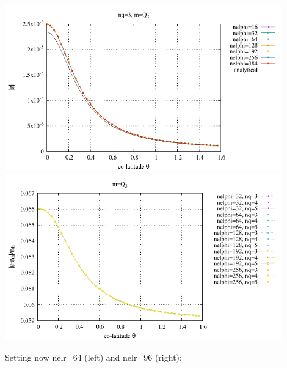 \begin{center}
\includegraphics[width=12cm]{python_codes/fieldstone_152/RESULTS/exp2/gravity/nelr32/gravity.pdf}
\includegraphics[width=12cm]{python_codes/fieldstone_152/RESULTS/exp2/gravity/nelr32/gravity_error.pdf}
\end{center}

Setting now {\python nelr=64} (left) and {\python nelr=96} (right):

